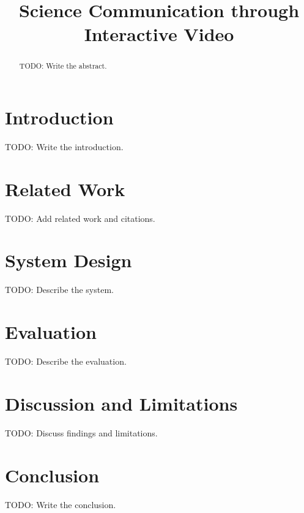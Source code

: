 \documentclass[sigconf,review,anonymous]{acmart}
\begin{document}
\title{Science Communication through Interactive Video}


\begin{abstract}
TODO: Write the abstract.
\end{abstract}


\maketitle

\section{Introduction}
\label{sec:introduction}
TODO: Write the introduction.

\section{Related Work}
\label{sec:related-work}
TODO: Add related work and citations.

\section{System Design}
\label{sec:system}
TODO: Describe the system.

\section{Evaluation}
\label{sec:evaluation}
TODO: Describe the evaluation.

\section{Discussion and Limitations}
\label{sec:discussion}
TODO: Discuss findings and limitations.

\section{Conclusion}
\label{sec:conclusion}
TODO: Write the conclusion.


% 
\end{document}

